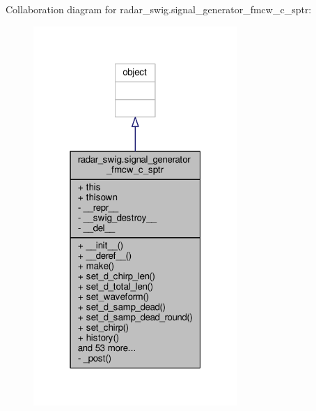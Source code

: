 Collaboration diagram for radar\+\_\+swig.\+signal\+\_\+generator\+\_\+fmcw\+\_\+c\+\_\+sptr\+:
\nopagebreak
\begin{figure}[H]
\begin{center}
\leavevmode
\includegraphics[width=220pt]{d1/d35/classradar__swig_1_1signal__generator__fmcw__c__sptr__coll__graph}
\end{center}
\end{figure}
